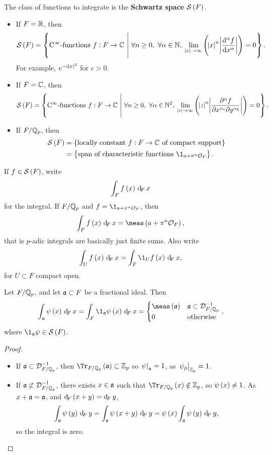 \begin{definition*}
The class of functions to integrate is the \textbf{Schwartz space} $ \SSS\br{F} $.
\begin{itemize}
\item If $ F = \mathbb{R} $, then
$$ \SSS\br{F} = \cbr{\text{$ \C^\infty $-functions} \ f : F \to \CC \st \forall n \ge 0, \ \forall \alpha \in \NN, \ \lim_{\abs{x} \to \infty} \br{\abs{x}^n\abs{\dod[\alpha]{f}{x}}} = 0}. $$
For example, $ e^{-c\abs{x}^2} $ for $ c > 0 $.
\item If $ F = \mathbb{C} $, then
$$ \SSS\br{F} = \cbr{\text{$ \C^\infty $-functions} \ f : F \to \CC \st \forall n \ge 0, \ \forall \alpha \in \NN^2, \ \lim_{\abs{z} \to \infty} \br{\abs{z}^n\abs{\dmd{f}{\alpha}{x}{\alpha_1}{y}{\alpha_2}}} = 0}. $$
\item If $ F / \mathbb{Q}_p $, then
\begin{align*}
\SSS\br{F}
& = \cbr{\text{locally constant} \ f : F \to \CC \ \text{of compact support}} \\
& = \cbr{\text{span of characteristic functions} \ \1_{a + \pi^n\OOO_F}}.
\end{align*}
\end{itemize}
\end{definition*}

If $ f \in \SSS\br{F} $, write
$$ \intF{f\br{x}}{x} $$
for the integral. If $ F / \mathbb{Q}_p $ and $ f = \1_{a + \pi^n\OOO_F} $, then
$$ \intF{f\br{x}}{x} = \meas\br{a + \pi^n\OOO_F}, $$
that is $ p $-adic integrals are basically just finite sums. Also write
$$ \intF[U]{f\br{x}}{x} = \intF{\1_Uf\br{x}}{x}, $$
for $ U \subset F $ compact open.

\begin{lemma}
\label{lem:9.4}
Let $ F / \mathbb{Q}_p $, and let $ \mathfrak{a} \subset F $ be a fractional ideal. Then
$$ \intF[\aaa]{\psi\br{x}}{x} = \intF{\1_\aaa\psi\br{x}}{x} =
\begin{cases}
\meas\br{\aaa} & \aaa \subset \DDD_{F / \QQ_p}^{-1} \\
0 & \text{otherwise}
\end{cases},
$$
where $ \1_\aaa\psi \in \SSS\br{F} $.
\end{lemma}

\begin{proof}
\hfill
\begin{itemize}
\item If $ \mathfrak{a} \subset \mathcal{D}_{F / \mathbb{Q}_p}^{-1} $, then $ \Tr_{F / \QQ_p}\br{\aaa} \subset \ZZ_p $ so $ \left. \psi \right|_{\mathfrak{a}} = 1 $, as $ \left. \psi_p \right|_{\mathbb{Z}_p} = 1 $.
\item If $ \mathfrak{a} \not\subset \mathcal{D}_{F / \mathbb{Q}_p}^{-1} $, there exists $ x \in \mathfrak{a} $ such that $ \Tr_{F / \QQ_p}\br{x} \notin \ZZ_p $, so $ \psi\br{x} \ne 1 $. As $ x + \mathfrak{a} = \mathfrak{a} $, and $ \dF\br{x + y} = \dF y $,
$$ \intF[\aaa]{\psi\br{y}}{y} = \intF[\aaa]{\psi\br{x + y}}{y} = \psi\br{x}\intF[\aaa]{\psi\br{y}}{y}, $$
so the integral is zero.
\end{itemize}
\end{proof}

